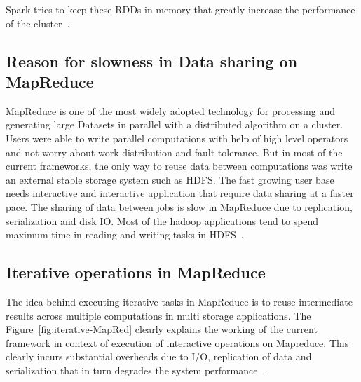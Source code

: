 Spark tries to keep these RDDs in memory that greatly increase the performance 
of the cluster~\cite{hid-sp18-410-spark-RDD}.

\subsection{Reason for slowness in Data sharing on MapReduce}

MapReduce is one of the most widely adopted technology  for processing and 
generating large Datasets in parallel with a distributed algorithm on a cluster.
 Users were able to write parallel computations with help of high level 
 operators and not worry about work distribution and fault tolerance. But in 
 most of the current frameworks, the only way to reuse data between 
 computations was write an external stable storage system such as HDFS. 
The fast growing user base needs interactive and interactive application that 
require data sharing at a faster pace. The sharing of data between jobs is slow 
in MapReduce due to replication, serialization and disk IO. Most of the hadoop 
applications tend to spend maximum time in reading and writing tasks in HDFS~\cite{hid-sp18-410-spark-RDD}.

\subsection{Iterative operations in MapReduce}

The idea behind executing iterative tasks in MapReduce is to reuse intermediate 
results across multiple computations in multi storage applications. 
The Figure~\ref{fig:iterative-MapRed} clearly explains the working of the  
current framework in context of execution of interactive operations on 
Mapreduce. This clearly incurs substantial overheads due to I/O, replication of 
data and serialization that in turn degrades the system performance~\cite{hid-sp18-410-spark-RDD}. 



